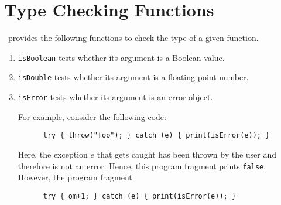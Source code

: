 \section{Type Checking Functions}
\setlx\ provides the following functions to check the type of a given function.
\begin{enumerate}
\item \texttt{isBoolean} tests whether its argument is a Boolean value.
\item \texttt{isDouble} tests whether its argument is a floating point number. 
\item \texttt{isError} tests whether its argument is an error object.

      For example, consider the following code:
      \begin{verbatim}
      try { throw("foo"); } catch (e) { print(isError(e)); }
      \end{verbatim}
      \vspace*{-0.5cm}

      Here, the exception $e$ that gets caught has been thrown by the user and therefore
      is not an error.  Hence, this program fragment prints \texttt{false}.
      However, the program fragment
      \begin{verbatim}
      try { om+1; } catch (e) { print(isError(e)); }
      \end{verbatim}
      \vspace*{-0.5cm}


\end{enumerate}
